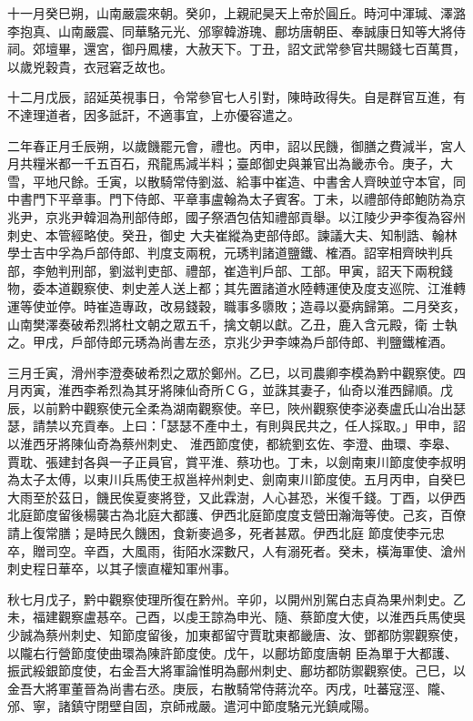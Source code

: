 \begin{pinyinscope}
 十一月癸巳朔，山南嚴震來朝。癸卯，上親祀昊天上帝於圓丘。時河中渾瑊、澤潞李抱真、山南嚴震、同華駱元光、邠寧韓游瑰、鄜坊唐朝臣、奉誠康日知等大將侍祠。郊壇畢，還宮，御丹鳳樓，大赦天下。丁丑，詔文武常參官共賜錢七百萬貫，以歲兇穀貴，衣冠窘乏故也。



 十二月戊辰，詔延英視事日，令常參官七人引對，陳時政得失。自是群官互進，有不達理道者，因多詆訐，不適事宜，上亦優容遣之。



 二年春正月壬辰朔，以歲饑罷元會，禮也。丙申，詔以民饑，御膳之費減半，宮人月共糧米都一千五百石，飛龍馬減半料；臺郎御史與兼官出為畿赤令。庚子，大雪，平地尺餘。壬寅，以散騎常侍劉滋、給事中崔造、中書舍人齊映並守本官，同中書門下平章事。門下侍郎、平章事盧翰為太子賓客。丁未，以禮部侍郎鮑防為京兆尹，京兆尹韓洄為刑部侍郎，國子祭酒包佶知禮部貢舉。以江陵少尹李復為容州刺史、本管經略使。癸丑，御史
 大夫崔縱為吏部侍郎。諫議大夫、知制誥、翰林學士吉中孚為戶部侍郎、判度支兩稅，元琇判諸道鹽鐵、榷酒。詔宰相齊映判兵部，李勉判刑部，劉滋判吏部、禮部，崔造判戶部、工部。甲寅，詔天下兩稅錢物，委本道觀察使、刺史差人送上都；其先置諸道水陸轉運使及度支巡院、江淮轉運等使並停。時崔造專政，改易錢穀，職事多隳敗；造尋以憂病歸第。二月癸亥，山南樊澤奏破希烈將杜文朝之眾五千，擒文朝以獻。乙丑，鹿入含元殿，衛
 士執之。甲戌，戶部侍郎元琇為尚書左丞，京兆少尹李竦為戶部侍郎、判鹽鐵榷酒。



 三月壬寅，滑州李澄奏破希烈之眾於鄭州。乙巳，以司農卿李模為黔中觀察使。四月丙寅，淮西李希烈為其牙將陳仙奇所ＣＧ，並誅其妻子，仙奇以淮西歸順。戊辰，以前黔中觀察使元全柔為湖南觀察使。辛巳，陜州觀察使李泌奏盧氏山冶出瑟瑟，請禁以充貢奉。上曰：「瑟瑟不產中土，有則與民共之，任人採取。」甲申，詔以淮西牙將陳仙奇為蔡州刺史、
 淮西節度使，都統劉玄佐、李澄、曲環、李皋、賈耽、張建封各與一子正員官，賞平淮、蔡功也。丁未，以劍南東川節度使李叔明為太子太傅，以東川兵馬使王叔邕梓州刺史、劍南東川節度使。五月丙申，自癸巳大雨至於茲日，饑民俟夏麥將登，又此霖澍，人心甚恐，米復千錢。丁酉，以伊西北庭節度留後楊襲古為北庭大都護、伊西北庭節度度支營田瀚海等使。己亥，百僚請上復常膳；是時民久饑困，食新麥過多，死者甚眾。伊西北庭
 節度使李元忠卒，贈司空。辛酉，大風雨，街陌水深數尺，人有溺死者。癸未，橫海軍使、滄州刺史程日華卒，以其子懷直權知軍州事。



 秋七月戊子，黔中觀察使理所復在黔州。辛卯，以開州別駕白志貞為果州刺史。乙未，福建觀察盧惎卒。己酉，以虔王諒為申光、隨、蔡節度大使，以淮西兵馬使吳少誠為蔡州刺史、知節度留後，加東都留守賈耽東都畿唐、汝、鄧都防禦觀察使，以隴右行營節度使曲環為陳許節度使。戊午，以鄜坊節度唐朝
 臣為單于大都護、振武綏銀節度使，右金吾大將軍論惟明為鄜州刺史、鄜坊都防禦觀察使。己巳，以金吾大將軍董晉為尚書右丞。庚辰，右散騎常侍蔣沇卒。丙戌，吐蕃寇涇、隴、邠、寧，諸鎮守閉壁自固，京師戒嚴。遣河中節度駱元光鎮咸陽。




\end{pinyinscope}
